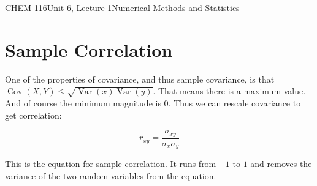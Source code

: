\documentclass{article}
\DeclareMathOperator{\Var}{Var}
\DeclareMathOperator{\Cov}{Cov}
\begin{document}
\begin{tdoc}{CHEM 116}{Unit 6, Lecture 1}{Numerical Methods and Statistics}
\section{Sample Correlation}

One of the properties of covariance, and thus sample covariance, is
that $\Cov(X,Y) \leq \sqrt{\Var(x)\Var(y)}$. That means there is a
maximum value. And of course the minimum magnitude is $0$. Thus we can
rescale covariance to get correlation:

\begin{equation}
  r_{xy} = \frac{\sigma_{xy}}{\sigma_x \sigma_y}
\end{equation}

This is the equation for sample correlation.  It runs from $-1$ to $1$
and removes the variance of the two random variables from the
equation.

\end{tdoc}
\end{document}
